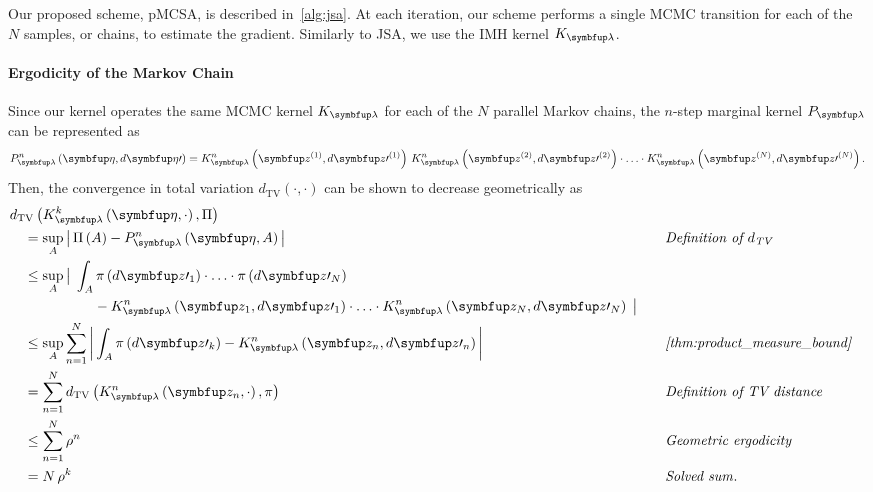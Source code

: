 \begin{proofEnd}

  Our proposed scheme, pMCSA, is described in~\cref{alg:jsa}. 
  At each iteration, our scheme performs a single MCMC transition for each of the \(N\) samples, or chains, to estimate the gradient.
  Similarly to JSA, we use the IMH kernel \(K_{\vlambda}\).

  \paragraph{Ergodicity of the Markov Chain}
  Since our kernel operates the same MCMC kernel \(K_{\vlambda}\) for each of the \(N\) parallel Markov chains, the \(n\)-step marginal kernel \(P_{\vlambda}\) can be represented as
  \begin{align*}
    P_{\vlambda}^n\left(\veta, d\veta\prime\right)
    = 
    K_{\vlambda}^n\left(\vz^{(1)}, d\vz\prime^{(1)}\right)
    \,
    K_{\vlambda}^n\left(\vz^{(2)}, d\vz\prime^{(2)}\right)
    \cdot
    \ldots 
    \cdot
    K_{\vlambda}^n\left(\vz^{(N)}, d\vz\prime^{(N)}\right).
  \end{align*}
  Then, the convergence in total variation \(d_{\mathrm{TV}}\left(\cdot, \cdot\right)\) can be shown to decrease geometrically as
  \begin{alignat}{2}
    &\DTV{K^{k}_{\vlambda}\left(\veta, \cdot\right)}{\Pi}
    \nonumber
    \\
    &\quad=
    \sup_{A}
    \abs{
      \Pi\left(A\right)
      -
      P^{n}_{\vlambda}\left(\veta, A\right)
    }
    &&\quad\text{\textit{Definition of \(d_{\text{TV}}\)}}
    \nonumber
    \\
    &\quad\leq
    \sup_{A}
    \big|\;
    \int_{A}
      \pi\left(d\vz\prime_1\right) \cdot \ldots \cdot \pi\left(d\vz\prime_N\right)
    \nonumber
      \\
      &\qquad\qquad\qquad-
      K^n_{\vlambda}\left(\vz_1, d\vz\prime_1\right) \cdot \ldots \cdot K^n_{\vlambda}\left(\vz_N, d\vz\prime_N\right)
    \;\big|
    \nonumber
    \\
    &\quad\leq
    \sup_{A}
    \sum_{n=1}^N
    \abs{
    \int_{A}
      \pi\left(d\vz\prime_k\right) - K^{n}_{\vlambda}\left(\vz_n, d\vz\prime_n\right) 
    }
    &&\quad\text{\textit{\cref{thm:product_measure_bound}}}
    \nonumber
    \\
    &\quad=
    \sum_{n=1}^N
    \DTV{K^n_{\vlambda}\left(\vz_n, \cdot\right)}{\pi}
    &&\quad\text{\textit{Definition of TV distance}}
    \nonumber
    \\
    &\quad\leq
    \sum_{n=1}^N
    \rho^{n}
    &&\quad\text{\textit{Geometric ergodicity}}
    \nonumber
    \\
    &\quad=
    N\,\rho^{k}
    &&\quad\text{\textit{Solved sum}}.
    \nonumber
  \end{alignat}


\end{proofEnd}
